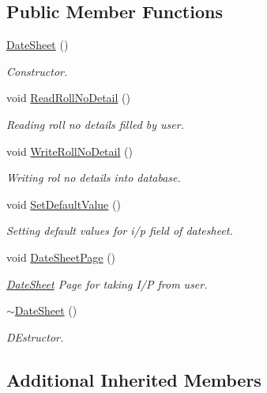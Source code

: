\subsection*{Public Member Functions}
\begin{DoxyCompactItemize}
\item 
\hyperlink{classDateSheet_a17a1e5adc9b48e53091b89061ee0a360}{Date\-Sheet} ()
\begin{DoxyCompactList}\small\item\em Constructor. \end{DoxyCompactList}\item 
void \hyperlink{classDateSheet_a0d68cd26658c7dfc37ef512e6ed30528}{Read\-Roll\-No\-Detail} ()
\begin{DoxyCompactList}\small\item\em Reading roll no details filled by user. \end{DoxyCompactList}\item 
void \hyperlink{classDateSheet_ab34e451b5322710f149a1fff5386d852}{Write\-Roll\-No\-Detail} ()
\begin{DoxyCompactList}\small\item\em Writing rol no details into database. \end{DoxyCompactList}\item 
void \hyperlink{classDateSheet_a2eab7d9256cd56064671ac4974846a7a}{Set\-Default\-Value} ()
\begin{DoxyCompactList}\small\item\em Setting default values for i/p field of datesheet. \end{DoxyCompactList}\item 
void \hyperlink{classDateSheet_a3a1721837309480f64f78745b865615f}{Date\-Sheet\-Page} ()
\begin{DoxyCompactList}\small\item\em \hyperlink{classDateSheet}{Date\-Sheet} Page for taking I/\-P from user. \end{DoxyCompactList}\item 
\hyperlink{classDateSheet_af17d25ae4f39caf7b9ea62d73541813b}{$\sim$\-Date\-Sheet} ()
\begin{DoxyCompactList}\small\item\em D\-Estructor. \end{DoxyCompactList}\end{DoxyCompactItemize}
\subsection*{Additional Inherited Members}


